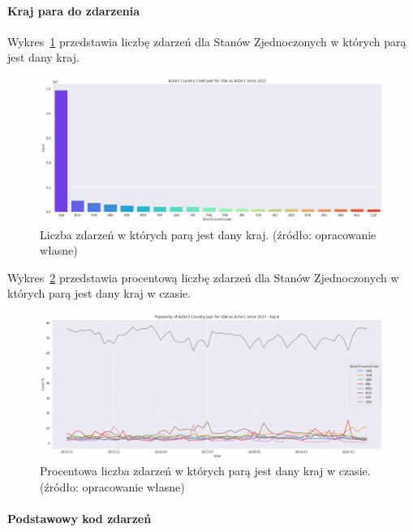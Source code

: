 \documentclass[11pt]{report}
\begin{document}
    \paragraph{Kraj para do zdarzenia}

    Wykres~\ref{fig:USApair} przedstawia liczbę zdarzeń dla Stanów Zjednoczonych w których parą jest dany kraj.

    \begin{figure}[!htp]
        \centering
        \includegraphics[width=\linewidth]{fig/USA/USAactor2Pair.png}
        \caption{Liczba zdarzeń w których parą jest dany kraj. (źródło: opracowanie własne)}
        \label{fig:USApair}
    \end{figure}


    Wykres~\ref{fig:USApairPerc} przedstawia procentową liczbę zdarzeń dla Stanów Zjednoczonych w których parą jest dany kraj w czasie.
    \begin{figure}[!htp]
        \centering
        \includegraphics[width=\linewidth]{fig/USA/USAactor2PairPercinTIME.png}
        \caption{Procentowa liczba zdarzeń w których parą jest dany kraj w czasie. (źródło: opracowanie własne)}
        \label{fig:USApairPerc}
    \end{figure}

    \paragraph{Podstawowy kod zdarzeń}
\end{document}
